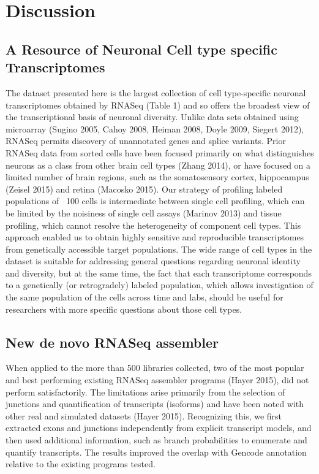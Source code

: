 
\section{Discussion}

\subsection{A Resource of Neuronal Cell type specific Transcriptomes}
The dataset presented here is the largest collection of cell type-specific neuronal transcriptomes obtained by RNASeq (Table 1) and so offers the broadest view of the transcriptional basis of neuronal diversity. Unlike data sets obtained using microarray (Sugino 2005, Cahoy 2008, Heiman 2008, Doyle 2009, Siegert 2012), RNASeq permits discovery of unannotated genes and splice variants. Prior RNASeq data from sorted cells have been focused primarily on what distinguishes neurons as a class from other brain cell types (Zhang 2014), or have focused on a limited number of brain regions, such as the somatosensory cortex, hippocampus (Zeisel 2015) and retina (Macosko 2015). Our strategy of profiling labeled populations of ~100 cells is intermediate between single cell profiling, which can be limited by the noisiness of single cell assays (Marinov 2013) and tissue profiling, which cannot resolve the heterogeneity of component cell types. This approach enabled us to obtain highly sensitive and reproducible transcriptomes from genetically accessible target populations. The wide range of cell types in the dataset is suitable for addressing general questions regarding neuronal identity and diversity, but at the same time, the fact that each transcriptome corresponds to a genetically (or retrogradely) labeled population, which allows investigation of the same population of the cells across time and labs, should be useful for researchers with more specific questions about those cell types.

\subsection{New de novo RNASeq assembler}
When applied to the more than 500 libraries collected, two of the most popular and best performing existing RNASeq assembler programs (Hayer 2015), did not perform satisfactorily. The limitations arise primarily from the selection of junctions and quantification of transcripts (isoforms) and have been noted with other real and simulated datasets (Hayer 2015). Recognizing this, we first extracted exons and junctions independently from explicit transcript models, and then used additional information, such as branch probabilities to enumerate and quantify transcripts. The results improved the overlap with Gencode annotation relative to the existing programs tested.


